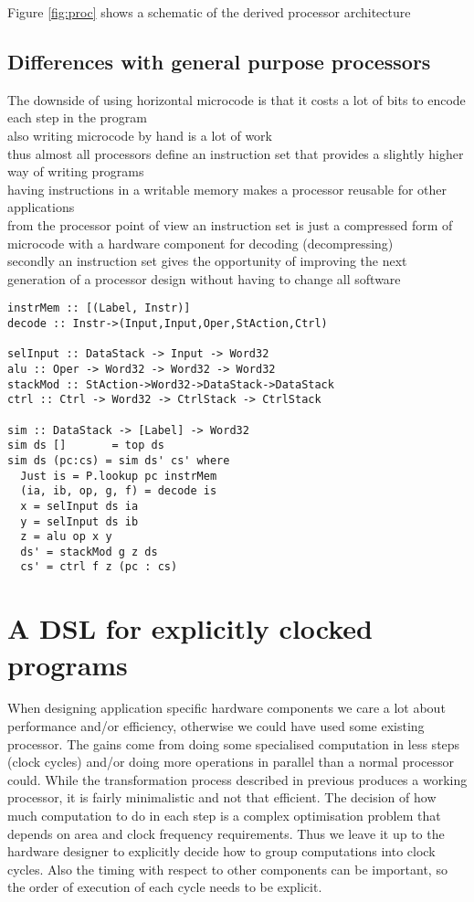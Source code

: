 \documentclass[preprint]{sigplanconf}
\begin{document}
Figure \ref{fig:proc} shows a schematic of the derived processor architecture

\subsection{Differences with general purpose processors}

The downside of using horizontal microcode is that it costs a lot of bits to encode each step in the program \\
also writing microcode by hand is a lot of work \\
thus almost all processors define an instruction set that provides a slightly higher way of writing programs \\
having instructions in a writable memory makes a processor reusable for other applications \\
from the processor point of view an instruction set is just a compressed form of microcode with a hardware component for decoding (decompressing) \\
secondly an instruction set gives the opportunity of improving the next generation of a processor design without having to change all software

\begin{lstlisting}
instrMem :: [(Label, Instr)]
decode :: Instr->(Input,Input,Oper,StAction,Ctrl)

selInput :: DataStack -> Input -> Word32
alu :: Oper -> Word32 -> Word32 -> Word32
stackMod :: StAction->Word32->DataStack->DataStack
ctrl :: Ctrl -> Word32 -> CtrlStack -> CtrlStack

sim :: DataStack -> [Label] -> Word32
sim ds []       = top ds
sim ds (pc:cs) = sim ds' cs' where
  Just is = P.lookup pc instrMem
  (ia, ib, op, g, f) = decode is
  x = selInput ds ia
  y = selInput ds ib
  z = alu op x y 
  ds' = stackMod g z ds
  cs' = ctrl f z (pc : cs)
\end{lstlisting}


\section{A DSL for explicitly clocked programs}
When designing application specific hardware components we care a lot about performance and/or efficiency, otherwise we could have used some existing processor.
The gains come from doing some specialised computation in less steps (clock cycles) and/or doing more operations in parallel than a normal processor could.
While the transformation process described in previous produces a working processor, it is fairly minimalistic and not that efficient.
The decision of how much computation to do in each step is a complex optimisation problem that depends on area and clock frequency requirements.
Thus we leave it up to the hardware designer to explicitly decide how to group computations into clock cycles.
Also the timing with respect to other components can be important, so the order of execution of each cycle needs to be explicit.
\end{document}
